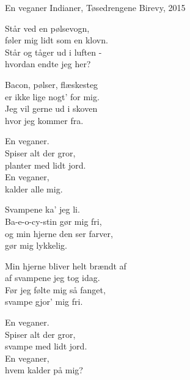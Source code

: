 \begin{song}{En veganer}
  {} %
  {Indianer, Tøsedrengene} %
  {} %
  {Birevy, 2015} %
  {\NotCCLIed} %

  \begin{SBVerse}
    Står ved en pølsevogn,\\
    føler mig lidt som en klovn.\\
    Står og tåger ud i luften -\\
    hvordan endte jeg her?
  \end{SBVerse}

  \begin{SBVerse}
    Bacon, pølser, flæskesteg\\
    er ikke lige nogt’ for mig.\\
    Jeg vil gerne ud i skoven\\
    hvor jeg kommer fra.
  \end{SBVerse}

  \begin{SBChorus}
    En veganer.\\
    Spiser alt der gror,\\
    planter med lidt jord.\\
    En veganer,\\
    kalder alle mig.
  \end{SBChorus}

  \begin{SBVerse}
    Svampene ka’ jeg li.\\
    Ba-e-o-cy-stin gør mig fri,\\
    og min hjerne den ser farver,\\
    gør mig lykkelig.
  \end{SBVerse}

  \begin{SBVerse}
    Min hjerne bliver helt brændt af\\
    af svampene jeg tog idag.\\
    Før jeg følte mig så fanget,\\
    svampe gjor’ mig fri.
  \end{SBVerse}

  \begin{SBChorus}
    En veganer.\\
    Spiser alt der gror,\\
    svampe med lidt jord.\\
    En veganer,\\
    hvem kalder på mig?
  \end{SBChorus}


\end{song}

